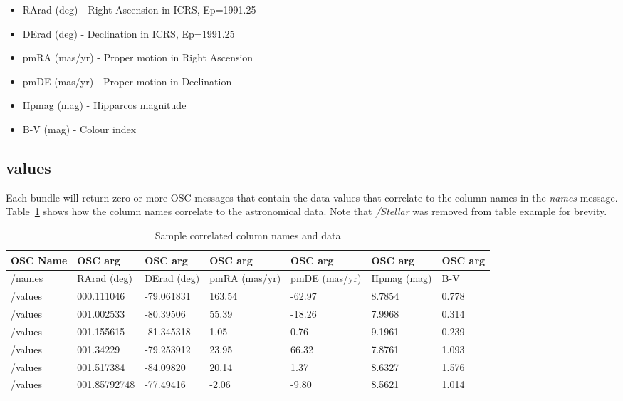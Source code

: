 \begin{itemize}
	\item RArad (deg) -  Right Ascension in ICRS, Ep=1991.25 
	\item DErad (deg) -  Declination in ICRS, Ep=1991.25
	\item pmRA (mas/yr) -  Proper motion in Right Ascension
	\item pmDE (mas/yr) - Proper motion in Declination 
	\item Hpmag (mag) - Hipparcos magnitude
	\item B-V (mag) -  Colour index
\end{itemize}

\subsection{values}
Each bundle will return zero or more OSC messages that contain the data values that correlate to the column names in the \textit{names} message. Table~\ref{tab:vizierData} shows how the column names correlate to the astronomical data. Note that \textit{/Stellar} was removed from table example for brevity.

\begin{table}
	\centering
	\caption{Sample correlated column names and data}
	\begin{tabular}{|l|l|l|l|l|l|l|}  \hline
		\textbf{OSC Name}&\textbf{OSC arg}&\textbf{OSC arg}&\textbf{OSC arg}&\textbf{OSC arg}&\textbf{OSC arg}&\textbf{OSC arg} \\ \hline
		/names&RArad (deg)&DErad (deg)&pmRA (mas/yr)&pmDE (mas/yr)&Hpmag (mag) &B-V\\ \hline
		/values&000.111046 &-79.061831 &163.54  & -62.97  &8.7854  &0.778\\ \hline
		/values&001.002533 &-80.39506  & 55.39  & -18.26  &7.9968  &0.314\\ \hline
		/values&001.155615 &-81.345318  &1.05     &0.76  &9.1961 & 0.239\\ \hline
		/values&001.34229  &-79.253912  & 23.95    &66.32  &7.8761  &1.093\\ \hline
		/values&001.517384 &-84.09820 &  20.14     &1.37  &8.6327  &1.576\\ \hline
		/values&001.85792748 &-77.49416  & -2.06    &-9.80  &8.5621  &1.014\\ \hline
		
		\hline\end{tabular}
	\label{tab:vizierData}
\end{table} 

